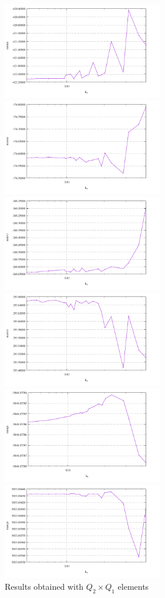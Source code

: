 \begin{center}
\includegraphics[width=7cm]{python_codes/fieldstone_25/results/min_u_100.pdf}
\includegraphics[width=7cm]{python_codes/fieldstone_25/results/max_u_100.pdf}\\
\includegraphics[width=7cm]{python_codes/fieldstone_25/results/min_v_100.pdf}
\includegraphics[width=7cm]{python_codes/fieldstone_25/results/max_v_100.pdf}\\
\includegraphics[width=7cm]{python_codes/fieldstone_25/results/min_p_100.pdf}
\includegraphics[width=7cm]{python_codes/fieldstone_25/results/max_p_100.pdf}\\
{\captionfont Results obtained with $Q_2\times Q_1$ elements} 
\end{center}

